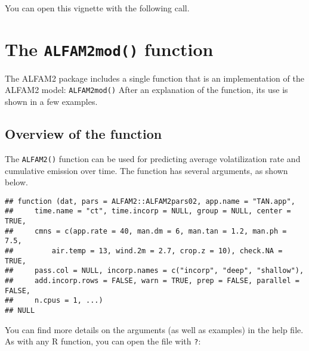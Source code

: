 \documentclass{article}
\begin{document}
You can open this vignette with the following call.

\begin{knitrout}
\color{fgcolor}\begin{kframe}
\begin{alltt}
\hlstd{(}\hlstd{)}
\end{alltt}
\end{kframe}
\end{knitrout}


\section{The \texttt{ALFAM2mod()} function}
The ALFAM2 package includes a single function that is an implementation of the ALFAM2 model: \texttt{ALFAM2mod()}
After an explanation of the function, its use is shown in a few examples.

\subsection{Overview of the function}
The \texttt{ALFAM2()} function can be used for predicting average volatilization rate and cumulative emission over time.
The function has several arguments, as shown below.

\begin{knitrout}
\color{fgcolor}\begin{kframe}
\begin{alltt}
\end{alltt}
\begin{verbatim}
## function (dat, pars = ALFAM2::ALFAM2pars02, app.name = "TAN.app", 
##     time.name = "ct", time.incorp = NULL, group = NULL, center = TRUE, 
##     cmns = c(app.rate = 40, man.dm = 6, man.tan = 1.2, man.ph = 7.5, 
##         air.temp = 13, wind.2m = 2.7, crop.z = 10), check.NA = TRUE, 
##     pass.col = NULL, incorp.names = c("incorp", "deep", "shallow"), 
##     add.incorp.rows = FALSE, warn = TRUE, prep = FALSE, parallel = FALSE, 
##     n.cpus = 1, ...) 
## NULL
\end{verbatim}
\end{kframe}
\end{knitrout}

You can find more details on the arguments (as well as examples) in the help file.
As with any R function, you can open the file with \texttt{?}:
\end{document}
